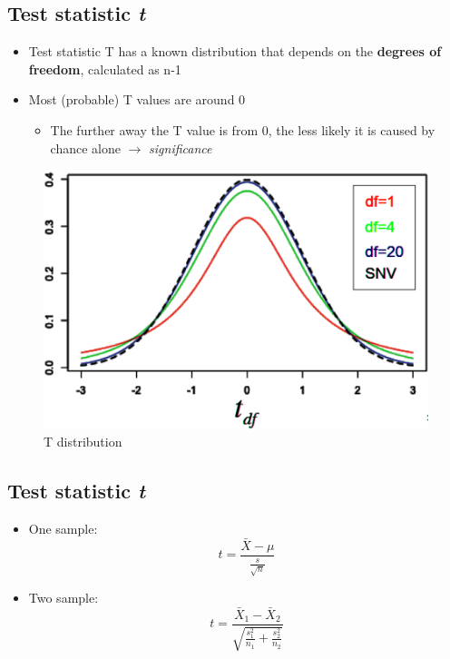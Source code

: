 \documentclass[
]{book}
\providecommand{\tightlist}{%
  \setlength{\itemsep}{0pt}\setlength{\parskip}{0pt}}
\begin{document}
\subsection{\texorpdfstring{Test statistic \emph{t}}{Test statistic t}}\label{test-statistic-t}

\begin{itemize}
\tightlist
\item
  Test statistic T has a known distribution that depends on the \textbf{degrees of freedom}, calculated as n-1
\item
  Most (probable) T values are around 0

  \begin{itemize}
  \tightlist
  \item
    The further away the T value is from 0, the less likely it is caused by chance alone \(\rightarrow\) \emph{significance}
  \end{itemize}
\end{itemize}

\begin{figure}
\centering
\includegraphics{./img/tdist.png}
\caption{T distribution}
\end{figure}

\subsection{\texorpdfstring{Test statistic \emph{t}}{Test statistic t}}\label{test-statistic-t-1}

\begin{itemize}
\item
  One sample: \[ t = \frac{\bar{X} - \mu}{\frac{s}{\sqrt{n}}} \]
\item
  Two sample: \[t = \frac{\bar{X}_1 - \bar{X}_2}{\sqrt{\frac{s_1^2}{n_1} + \frac{s_2^2}{n_2}}} \]
\end{itemize}
\end{document}
